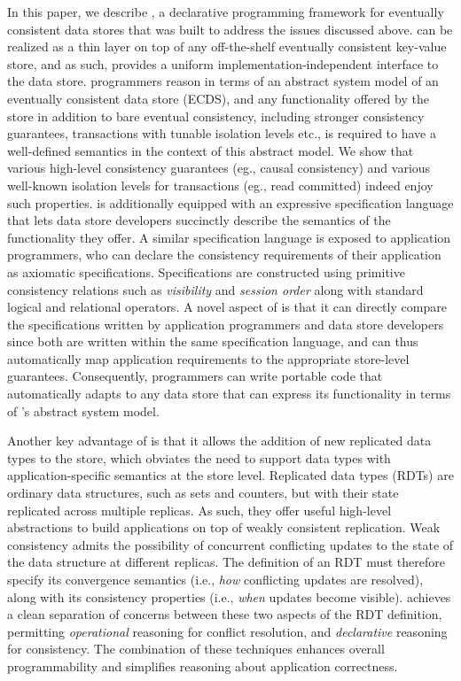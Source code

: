 In this paper, we describe \name, a declarative programming framework
for eventually consistent data stores that was built to address the
issues discussed above. \name can be realized as a thin layer on top
of any off-the-shelf eventually consistent key-value store, and as
such, provides a uniform implementation-independent interface to the
data store. \name programmers reason in terms of an abstract system
model of an eventually consistent data store (ECDS), and any
functionality offered by the store in addition to bare eventual
consistency, including stronger consistency guarantees, transactions
with tunable isolation levels etc., is required to have a well-defined
semantics in the context of this abstract model. We show that various
high-level consistency guarantees (eg., causal consistency) and
various well-known isolation levels for transactions (eg., read
committed) indeed enjoy such properties.  \name is additionally
equipped with an expressive specification language that lets data
store developers succinctly describe the semantics of the functionality
they offer. A similar specification language is exposed to application
programmers, who can declare the consistency requirements of their
application as axiomatic specifications. Specifications are
constructed using primitive consistency relations such as
\emph{visibility} and \emph{session order} along with standard logical
and relational operators. A novel aspect of \name is that it can
directly compare the specifications written by application programmers
and data store developers since both are written within the same
specification language, and can thus automatically map application
requirements to the appropriate store-level guarantees. Consequently,
\name programmers can write portable code that automatically adapts to
any data store that can express its functionality in terms of \name's
abstract system model.

Another key advantage of \name is that it allows the addition of new
replicated data types to the store, which obviates the need to support
data types with application-specific semantics at the store level.
Replicated data types (RDTs) are ordinary data structures, such as
sets and counters, but with their state replicated across multiple
replicas. As such, they offer useful high-level abstractions to build
applications on top of weakly consistent replication. Weak consistency
admits the possibility of concurrent conflicting updates to the state
of the data structure at different replicas. The definition of an RDT
must therefore specify its convergence semantics (i.e., \emph{how}
conflicting updates are resolved), along with its consistency
properties (i.e., \emph{when} updates become visible). \name achieves
a clean separation of concerns between these two aspects of the RDT
definition, permitting \emph{operational} reasoning for conflict
resolution, and \emph{declarative} reasoning for consistency.  The
combination of these techniques enhances overall programmability and
simplifies reasoning about application correctness.

